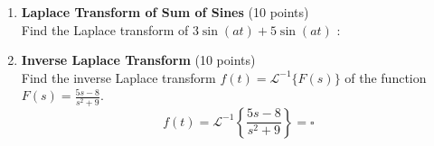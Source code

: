 \begin{enumerate}
\begin{enumerate}[label=(\alph*)]
    \begin{enumerate}[label=(\Roman*)]
      \item continuous on $0 \leq t<\infty$.
      \item discontinuous but piecewise continuous on $0 \leq t<\infty$.
      \item neither.
    \end{enumerate}
    \begin{subanswer}
    \end{subanswer}
    \item Is $f(t)$ exponentially bounded on $0 \leq t<\infty$?
    \begin{subanswer}
    \end{subanswer}
    \item Does the Laplace transform of $f(t)$ exist (on some domain, i.e., for some values of $s$)?
    \begin{subanswer}
    \end{subanswer}
  \end{enumerate}

  \item \textbf{Laplace Transform of Sum of Sines} (10 points)\\
  Find the Laplace transform of $3 \sin (a t)+5 \sin (a t)$ :
  \begin{subanswer}
  \end{subanswer}

  \item \textbf{Inverse Laplace Transform} (10 points)\\
  Find the inverse Laplace transform $f(t)=\mathcal{L}^{-1}\{F(s)\}$ of the function $F(s)=\frac{5 s-8}{s^2+9}$.
  $$
  f(t)=\mathcal{L}^{-1}\left\{\frac{5 s-8}{s^2+9}\right\}=\square
  $$
  \begin{subanswer}
  \end{subanswer}



\end{enumerate}
